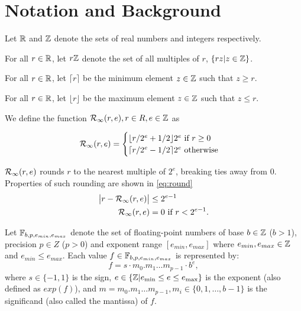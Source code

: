 \section{Notation and Background}
  Let $\mathbb{R}$ and $\mathbb{Z}$ denote the sets of real numbers and integers respectively.

  For all $r \in \mathbb{R}$, let $r\mathbb{Z}$ denote the set of all multiples of $r$,
  $\{rz | z \in \mathbb{Z}\}$.

  For all $r \in \mathbb{R}$, let $\lceil r \rceil$ be the minimum element $z \in \mathbb{Z}$
  such that $z \geq r$.

  For all $r \in \mathbb{R}$, let $\lfloor r \rfloor$ be the maximum element $z \in \mathbb{Z}$
  such that $z \leq r$.

  We define the function $\mathcal{R}_\text{$\infty$}(r, e), r \in R, e \in \mathbb{Z}$ as

  \begin{equation}
    \mathcal{R}_\text{$\infty$}(r, e) = \begin{cases}
        \lfloor r/2^e + 1/2 \rfloor 2^e \text{ if } r \geq 0\\
        \lceil r/2^e - 1/2 \rceil 2^e \text{ otherwise}
    \end{cases}
  \end{equation}

  $\mathcal{R}_\text{$\infty$}(r, e)$ rounds $r$ to the nearest multiple of $2^e$,
  breaking ties away from 0. Properties of such rounding are shown in
  \eqref{eq:round}
  \begin{equation}
    \begin{aligned}
    \bigl|r - \mathcal{R}_\text{$\infty$}(r, e)\bigr| & \leq 2^{e - 1} \\
    \mathcal{R}_\text{$\infty$}(r,e) & = 0 \text{ if } r < 2^{e-1}.
    \end{aligned}
    \label{eq:round}
  \end{equation}

  Let $\mathbb{F}_{b,p,e_{min},e_{max}}$ denote the set of floating-point numbers
  of base $b \in \mathbb{Z}$ ($b > 1$),
  precision $p \in Z$ ($p > 0$) and exponent range $[e_{min}, e_{max}]$
  where $e_{min}, e_{max} \in \mathbb{Z}$ and $e_{min} \leq e_{max}$.
  Each value $f \in \mathbb{F}_{b,p,e_{min},e_{max}}$ is represented by:
  \[
    f = s \cdot m_0.m_1 \ldots m_{p-1} \cdot b^e,
  \]
  where $s \in \{-1,1 \}$ is the sign,
  $e \in \{\mathbb{Z} | e_{\text{min}} \leq e \leq e_{\text{max}} \}$ is the exponent
  (also defined as $exp(f)$),
  and $m = m_0.m_1 \ldots m_{p-1}, m_i \in \{ 0, 1, \ldots, b-1 \}$
  is the significand (also called the mantissa) of $f$.

